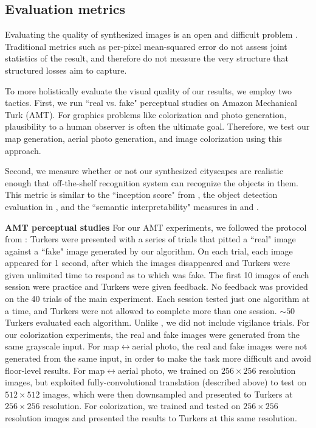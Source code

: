 \documentclass[10pt,twocolumn,letterpaper]{article}
\begin{document}

%


\subsection{Evaluation metrics}
Evaluating the quality of synthesized images is an open and difficult problem \cite{salimans2016improved}. Traditional metrics such as per-pixel mean-squared error do not assess joint statistics of the result, and therefore do not measure the very structure that structured losses aim to capture.

To more holistically evaluate the visual quality of our results, we employ two tactics. First, we run ``real vs. fake" perceptual studies on Amazon Mechanical Turk (AMT). For graphics problems like colorization and photo generation, plausibility to a human observer is often the ultimate goal. Therefore, we test our map generation, aerial photo generation, and image colorization using this approach.

Second, we measure whether or not our synthesized cityscapes are realistic enough that off-the-shelf recognition system can recognize the objects in them. This metric is similar to the ``inception score" from \cite{salimans2016improved}, the object detection evaluation in \cite{wang2016generative}, and the ``semantic interpretability" measures in \cite{zhang2016colorful} and \cite{owens2016visually}.

{\bf AMT perceptual studies} For our AMT experiments, we followed the protocol from \cite{zhang2016colorful}: Turkers were presented with a series of trials that pitted a ``real" image against a ``fake" image generated by our algorithm. On each trial, each image appeared for 1 second, after which the images disappeared and Turkers were given unlimited time to respond as to which was fake. The first 10 images of each session were practice and Turkers were given feedback. No feedback was provided on the 40 trials of the main experiment. Each session tested just one algorithm at a time, and Turkers were not allowed to complete more than one session. $\sim 50$ Turkers evaluated each algorithm. Unlike \cite{zhang2016colorful}, we did not include vigilance trials. For our colorization experiments, the real and fake images were generated from the same grayscale input. For map$\leftrightarrow$aerial photo, the real and fake images were not generated from the same input, in order to make the task more difficult and avoid floor-level results. For map$\leftrightarrow$aerial photo, we trained on $256 \times 256$ resolution images, but exploited fully-convolutional translation (described above) to test on $512 \times 512$ images, which were then downsampled and presented to Turkers at $256 \times 256$ resolution. For colorization, we trained and tested on $256 \times 256$ resolution images and presented the results to Turkers at this same resolution.
\end{document}
